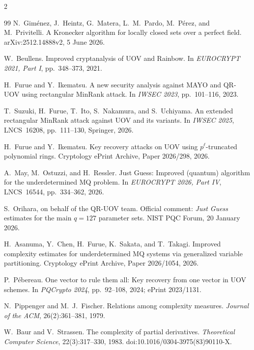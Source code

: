 \documentclass[11pt,a4paper]{article}
\theoremstyle{definition}
\theoremstyle{remark}
\newcommand{\QRUOV}{\textsf{QR-UOV}}
\begin{document}
\begin{multicols}{2}
\begin{thebibliography}{99}
N.~Gim\'enez, J.~Heintz, G.~Matera, L.~M.~Pardo, M.~P\'erez, and M.~Privitelli.
\newblock A Kronecker algorithm for locally closed sets over a perfect field.
\newblock arXiv:2512.14888v2, 5 June 2026.

W.~Beullens.
\newblock Improved cryptanalysis of UOV and Rainbow.
\newblock In \emph{EUROCRYPT 2021, Part I}, pp.~348--373, 2021.

H.~Furue and Y.~Ikematsu.
\newblock A new security analysis against MAYO and QR-UOV using rectangular MinRank attack.
\newblock In \emph{IWSEC 2023}, pp.~101--116, 2023.

T.~Suzuki, H.~Furue, T.~Ito, S.~Nakamura, and S.~Uchiyama.
\newblock An extended rectangular MinRank attack against UOV and its variants.
\newblock In \emph{IWSEC 2025}, LNCS~16208, pp.~111--130, Springer, 2026.

H.~Furue and Y.~Ikematsu.
\newblock Key recovery attacks on UOV using $p^\ell$-truncated polynomial rings.
\newblock Cryptology ePrint Archive, Paper 2026/298, 2026.

A.~May, M.~Ostuzzi, and H.~Ressler.
\newblock Just Guess: Improved (quantum) algorithm for the underdetermined MQ problem.
\newblock In \emph{EUROCRYPT 2026, Part IV}, LNCS~16544, pp.~334--362, 2026.

S.~Orihara, on behalf of the \QRUOV{} team.
\newblock Official comment: \emph{Just Guess} estimates for the main $q=127$ parameter sets.
\newblock NIST PQC Forum, 20 January 2026.

H.~Asanuma, Y.~Chen, H.~Furue, K.~Sakata, and T.~Takagi.
\newblock Improved complexity estimates for underdetermined MQ systems via generalized variable partitioning.
\newblock Cryptology ePrint Archive, Paper 2026/1054, 2026.

P.~P\'ebereau.
\newblock One vector to rule them all: Key recovery from one vector in UOV schemes.
\newblock In \emph{PQCrypto 2024}, pp.~92--108, 2024; ePrint 2023/1131.


N.~Pippenger and M.~J.~Fischer.
\newblock Relations among complexity measures.
\newblock \emph{Journal of the ACM}, 26(2):361--381, 1979.

W.~Baur and V.~Strassen.
\newblock The complexity of partial derivatives.
\newblock \emph{Theoretical Computer Science}, 22(3):317--330, 1983.
\newblock doi:10.1016/0304-3975(83)90110-X.


\end{thebibliography}
\end{multicols}
\end{document}
